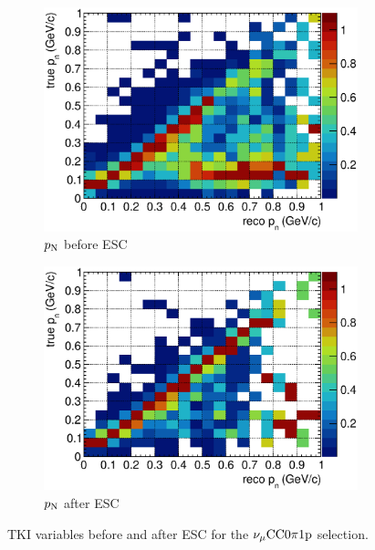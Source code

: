 \begin{figure}
\begin{subfigure}[b]{\dbfigwid\textwidth}
               \centering
               \includegraphics[width=\textwidth]{figures/perf/tki/pn_colnor_resmat_al13.eps}
               \caption{$p_\textrm{N}$ before ESC}
               \label{subfig:esc-pn-bfesc}
          \end{subfigure}
          \begin{subfigure}[b]{\dbfigwid\textwidth}
               \centering
               \includegraphics[width=\textwidth]{figures/perf/tki/pn_colnor_resmat_al14.eps}
               \caption{$p_\textrm{N}$ after ESC}
               \label{subfig:esc-pn-afesc}
          \end{subfigure}
          \caption{TKI variables before and after ESC for the $\nu_{\mu}\textrm{CC}0\pi1\textrm{p}$ selection.}
          \label{fig:mc-tki-0pi-esc}
     \end{figure}

